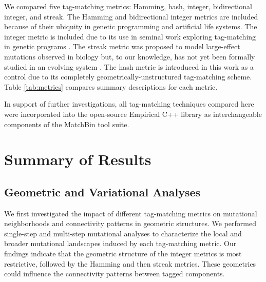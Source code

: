 

We compared five tag-matching metrics: Hamming, hash, integer, bidirectional integer, and streak.
The Hamming and bidirectional integer metrics are included because of their ubiquity in genetic programming and artificial life systems.
The integer metric is included due to its use in seminal work exploring tag-matching in genetic programs \citep{spector2011tag, spector2011s,spector2012tag}.
The streak metric was proposed to model large-effect mutations observed in biology but, to our knowledge, has not yet been formally studied in an evolving system \citep{downing2015intelligence}.
The hash metric is introduced in this work as a control due to its completely geometrically-unstructured tag-matching scheme.
Table \ref{tab:metrics} compares summary descriptions for each metric.

In support of further investigations, all tag-matching techniques compared here were incorporated into the open-source Empirical C++ library \citep{charles_ofria_2019_2575607} as interchangeable components of the MatchBin tool suite.

\section{Summary of Results}


\subsection{Geometric and Variational Analyses}

We first investigated the impact of different tag-matching metrics on mutational neighborhoods and connectivity patterns in geometric structures.
We performed single-step and multi-step mutational analyses to characterize the local and broader mutational landscapes induced by each tag-matching metric.
Our findings indicate that the geometric structure of the integer metrics is most restrictive, followed by the Hamming and then streak metrics. These geometries could influence the connectivity patterns between tagged components.

